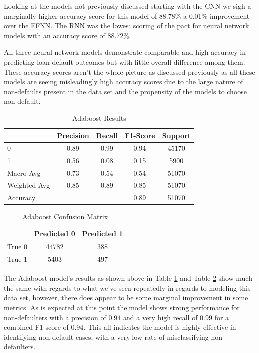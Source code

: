 \documentclass[12pt]{article}
\begin{document}
Looking at the models not previously discussed starting with the CNN we sigh a marginally higher accuracy score for this model of 88.78\% a 0.01\% improvement over the FFNN. The RNN was the lowest scoring of the pact for neural network models with an accuracy score of 88.72\%.

All three neural network models demonstrate comparable and high accuracy in predicting loan default outcomes but with little overall difference among them. These accuracy scores aren't the whole picture as discussed previously as all these models are seeing misleadingly high accuracy scores due to the large nature of non-defaults present in the data set and the propensity of the models to choose non-default.

\begin{table}[htbp]
    \centering
    \caption{Adaboost Results}
    \begin{tabular}{lcccc}
        \toprule
        & Precision & Recall & F1-Score & Support \\
        \midrule
        0 & 0.89 & 0.99 & 0.94 & 45170 \\
        1 & 0.56 & 0.08 & 0.15 & 5900 \\
        Macro Avg & 0.73 & 0.54 & 0.54 & 51070 \\
        Weighted Avg & 0.85 & 0.89 & 0.85 & 51070 \\
        \midrule
        Accuracy & & & 0.89 & 51070 \\
        \bottomrule
    \end{tabular}
    \label{table:adaboostResults}
\end{table}

\begin{table}[htbp]
    \centering
    \caption{Adaboost Confusion Matrix}
    \begin{tabular}{lcc}
        \toprule
        & Predicted 0 & Predicted 1 \\
        \midrule
        True 0 & 44782 & 388 \\
        True 1 & 5403 & 497 \\
        \bottomrule
    \end{tabular}
    \label{table:adaboostConfusionMatrix}
\end{table}

The Adaboost model's results as shown above in Table \ref{table:adaboostResults} and Table \ref{table:adaboostConfusionMatrix} show much the same with regards to what we've seen repeatedly in regards to modeling this data set, however, there does appear to be some marginal improvement in some metrics. As is expected at this point the model shows strong performance for non-defaulters with a precision of 0.94 and a very high recall of 0.99 for a combined F1-score of 0.94. This all indicates the model is highly effective in identifying non-default cases, with a very low rate of misclassifying non-defaulters.
\end{document}
